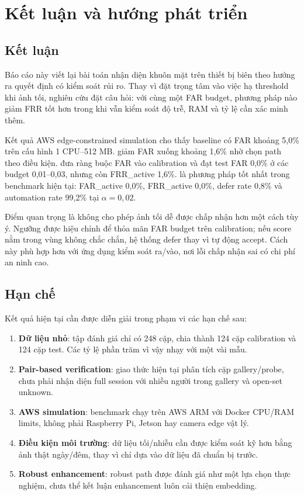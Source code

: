 \section{Kết luận và hướng phát triển}

\subsection{Kết luận}

Báo cáo này viết lại bài toán nhận diện khuôn mặt trên thiết bị biên theo hướng ra quyết định có kiểm soát rủi ro. Thay vì đặt trọng tâm vào việc hạ threshold khi ảnh tối, nghiên cứu đặt câu hỏi: với cùng một FAR budget, phương pháp nào giảm FRR tốt hơn trong khi vẫn kiểm soát độ trễ, RAM và tỷ lệ cần xác minh thêm.

Kết quả AWS edge-constrained simulation cho thấy baseline  có FAR khoảng 5,0\% trên cấu hình 1 CPU--512 MB.  giảm FAR xuống khoảng 1,6\% nhờ chọn path theo điều kiện.  đưa ràng buộc FAR vào calibration và đạt test FAR 0,0\% ở các budget 0,01--0,03, nhưng còn FRR\_active 1,6\%.  là phương pháp tốt nhất trong benchmark hiện tại: FAR\_active 0,0\%, FRR\_active 0,0\%, defer rate 0,8\% và automation rate 99,2\% tại $\alpha=0{,}02$.

Điểm quan trọng là  không cho phép ảnh tối dễ được chấp nhận hơn một cách tùy ý. Ngưỡng được hiệu chỉnh để thỏa mãn FAR budget trên calibration; nếu score nằm trong vùng không chắc chắn, hệ thống defer thay vì tự động accept. Cách này phù hợp hơn với ứng dụng kiểm soát ra/vào, nơi lỗi chấp nhận sai có chi phí an ninh cao.

\subsection{Hạn chế}

Kết quả hiện tại cần được diễn giải trong phạm vi các hạn chế sau:

\begin{enumerate}
    \item \textbf{Dữ liệu nhỏ}: tập đánh giá chỉ có 248 cặp, chia thành 124 cặp calibration và 124 cặp test. Các tỷ lệ phần trăm vì vậy nhạy với một vài mẫu.
    \item \textbf{Pair-based verification}: giao thức hiện tại phân tích cặp gallery/probe, chưa phải nhận diện full session với nhiều người trong gallery và open-set unknown.
    \item \textbf{AWS simulation}: benchmark chạy trên AWS ARM với Docker CPU/RAM limits, không phải Raspberry Pi, Jetson hay camera edge vật lý.
    \item \textbf{Điều kiện môi trường}: dữ liệu tối/nhiễu cần được kiểm soát kỹ hơn bằng ảnh thật ngày/đêm, thay vì chỉ dựa vào dữ liệu đã chuẩn bị trước.
    \item \textbf{Robust enhancement}: robust path được đánh giá như một lựa chọn thực nghiệm, chưa thể kết luận enhancement luôn cải thiện embedding.
\end{enumerate}

